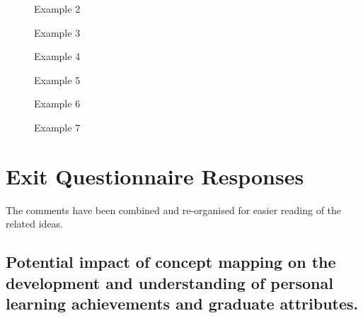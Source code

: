 \begin{figure}[!htb]
\centering
\setlength\fboxsep{0pt}
\setlength\fboxrule{0.5pt}
\caption{Example 2}
\end{figure}

\begin{figure}[!htb]
\centering
\setlength\fboxsep{0pt}
\setlength\fboxrule{0.5pt}
\caption{Example 3}
\end{figure}

\begin{figure}[!htb]
\centering
\setlength\fboxsep{0pt}
\setlength\fboxrule{0.5pt}
\caption{Example 4}
\end{figure}

\begin{figure}[!htb]
\centering
\setlength\fboxsep{0pt}
\setlength\fboxrule{0.5pt}
\caption{Example 5}
\end{figure}

\begin{figure}[!htb]
\centering
\setlength\fboxsep{0pt}
\setlength\fboxrule{0.5pt}
\caption{Example 6}
\end{figure}

\FloatBarrier

\begin{figure}[!htb]
\centering
\setlength\fboxsep{0pt}
\setlength\fboxrule{0.5pt}
\caption{Example 7}
\end{figure}

\section{Exit Questionnaire Responses}
\label{sec:responses}
The comments have been combined and re-organised for easier reading of the
related ideas.


\subsection[Potential Impact of Concept Mapping]{Potential impact of concept
mapping on the development and understanding of personal learning achievements
and graduate attributes.}

